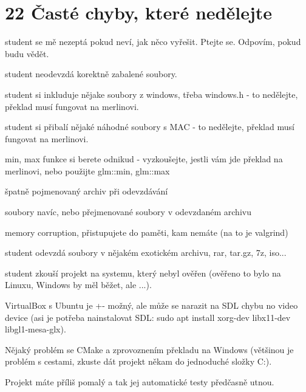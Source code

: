 \chapter{22 Časté chyby, které nedělejte}
\hypertarget{p22_caste_chyby}{}\label{p22_caste_chyby}

\begin{DoxyEnumerate}
\item student se mě nezeptá pokud neví, jak něco vyřešit. Ptejte se. Odpovím, pokud budu vědět. 
\item student neodevzdá korektně zabalené soubory. 
\item student si inkluduje nějake soubory z windows, třeba windows.\+h -\/ to nedělejte, překlad musí fungovat na merlinovi. 
\item student si přibalí nějaké náhodné soubory s MAC -\/ to nedělejte, překlad musí fungovat na merlinovi. 
\item min, max funkce si berete odnikud -\/ vyzkoušejte, jestli vám jde překlad na merlinovi, nebo použijte glm\+::min, glm\+::max 
\item špatně pojmenovaný archiv při odevzdávání 
\item soubory navíc, nebo přejmenované soubory v odevzdaném archivu 
\item memory corruption, přistupujete do paměti, kam nemáte (na to je valgrind) 
\item student odevzdá soubory v nějakém exotickém archivu, rar, tar.\+gz, 7z, iso... 
\item student zkouší projekt na systemu, který nebyl ověřen (ověřeno to bylo na Linuxu, Windows by měl běžet, ale ...). 
\item Virtual\+Box s Ubuntu je +-\/ možný, ale může se narazit na SDL chybu no video device (asi je potřeba nainstalovat SDL\+: sudo apt install xorg-\/dev libx11-\/dev libgl1-\/mesa-\/glx). 
\item Nějaký problém se CMake a zprovoznením překladu na Windows (většinou je problém s cestami, zkuste dát projekt někam do jednoduché složky C\+:). 
\item Projekt máte příliš pomalý a tak jej automatické testy předčasně utnou. 
\end{DoxyEnumerate}